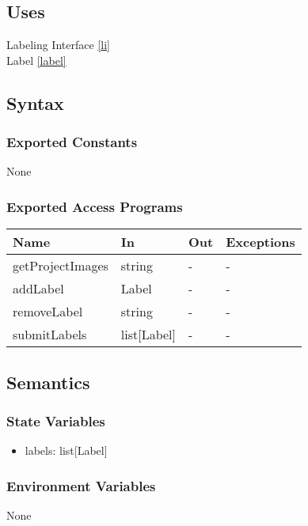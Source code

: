 \documentclass[12pt, titlepage]{article}
\begin{document}
\subsection{Uses}

Labeling Interface \ref{li}\\
Label \ref{label} \\

\subsection{Syntax}

\subsubsection{Exported Constants}
None
\subsubsection{Exported Access Programs}

\begin{center}
\begin{tabular}{p{4cm} p{4cm} p{4cm} p{2cm}}
\hline
\textbf{Name} & \textbf{In} & \textbf{Out} & \textbf{Exceptions} \\
\hline
getProjectImages & string & - & - \\
addLabel & Label & - & - \\
removeLabel & string & - & - \\
submitLabels & list[Label] & - & - \\
\hline
\end{tabular}
\end{center}

\subsection{Semantics}

\subsubsection{State Variables}
\begin{itemize}
    \item labels: list[Label]
\end{itemize}

\subsubsection{Environment Variables}
None
\end{document}

